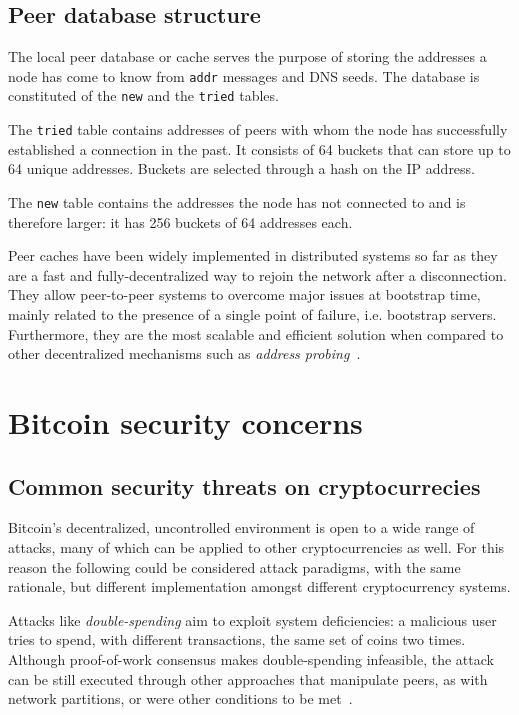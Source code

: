 \documentclass[12pt, letterpaper, twoside]{article}
\begin{document}
\subsection{Peer database structure}\label{sec:cachestruct}
The local peer database or cache serves the purpose of storing the addresses a node has come to know from \texttt{addr} messages and DNS seeds. The database is constituted of the \texttt{new} and the \texttt{tried} tables.

The \texttt{tried} table contains addresses of peers with whom the node has successfully established a connection in the past. It consists of 64 buckets that can store up to 64 unique addresses. Buckets are selected through a hash on the IP address.

The \texttt{new} table contains the addresses the node has not connected to and is therefore larger: it has 256 buckets of 64 addresses each.

Peer caches have been widely implemented in distributed systems so far as they are a fast and fully-decentralized way to rejoin the network after a disconnection. They allow peer-to-peer systems to overcome major issues at bootstrap time, mainly related to the presence of a single point of failure, i.e. bootstrap servers. Furthermore, they are the most scalable and efficient solution when compared to other decentralized mechanisms such as \textit{address probing}~\cite{decentrbootstrapp2p}.

\section{Bitcoin security concerns}\label{sec:securityintro}
\subsection{Common security threats on cryptocurrecies}
Bitcoin's decentralized, uncontrolled environment is open to a wide range of attacks, many of which can be applied to other cryptocurrencies as well. For this reason the following could be considered attack paradigms, with the same rationale, but different implementation amongst different cryptocurrency systems.

Attacks like \textit{double-spending} aim to exploit system deficiencies: a malicious user tries to spend, with different transactions, the same set of coins two times. Although proof-of-work consensus makes double-spending infeasible, the attack can be still executed through other approaches that manipulate peers, as with network partitions, or were other conditions to be met~\cite{doublespendfastpay}.
\end{document}
